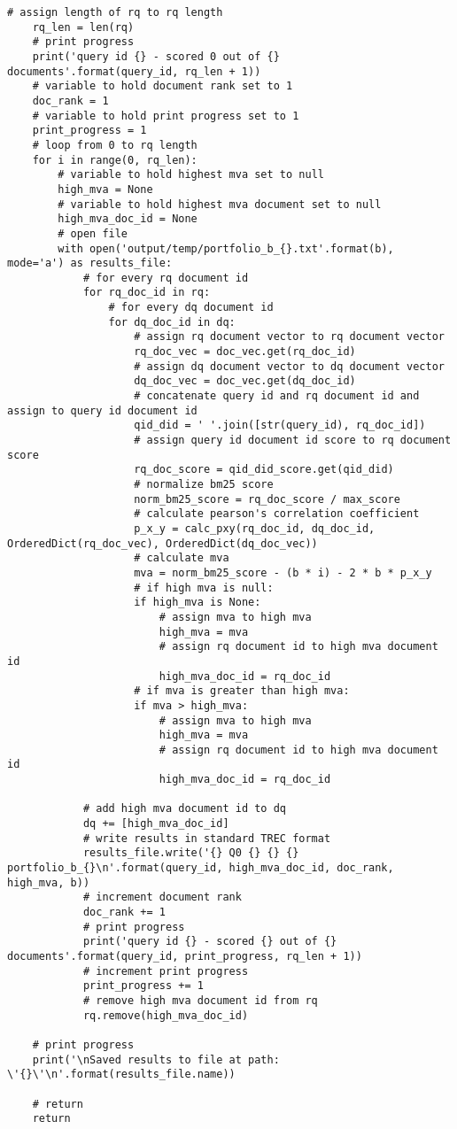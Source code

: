 \documentclass{article} %
\begin{document}
\begin{lstlisting}[style=Python]
    # assign length of rq to rq length
    rq_len = len(rq)
    # print progress
    print('query id {} - scored 0 out of {} documents'.format(query_id, rq_len + 1))
    # variable to hold document rank set to 1
    doc_rank = 1
    # variable to hold print progress set to 1
    print_progress = 1
    # loop from 0 to rq length
    for i in range(0, rq_len):
        # variable to hold highest mva set to null
        high_mva = None
        # variable to hold highest mva document set to null
        high_mva_doc_id = None
        # open file
        with open('output/temp/portfolio_b_{}.txt'.format(b), mode='a') as results_file:
            # for every rq document id
            for rq_doc_id in rq:
                # for every dq document id
                for dq_doc_id in dq:
                    # assign rq document vector to rq document vector
                    rq_doc_vec = doc_vec.get(rq_doc_id)
                    # assign dq document vector to dq document vector
                    dq_doc_vec = doc_vec.get(dq_doc_id)
                    # concatenate query id and rq document id and assign to query id document id
                    qid_did = ' '.join([str(query_id), rq_doc_id])
                    # assign query id document id score to rq document score
                    rq_doc_score = qid_did_score.get(qid_did)
                    # normalize bm25 score
                    norm_bm25_score = rq_doc_score / max_score
                    # calculate pearson's correlation coefficient
                    p_x_y = calc_pxy(rq_doc_id, dq_doc_id, OrderedDict(rq_doc_vec), OrderedDict(dq_doc_vec))
                    # calculate mva
                    mva = norm_bm25_score - (b * i) - 2 * b * p_x_y
                    # if high mva is null:
                    if high_mva is None:
                        # assign mva to high mva
                        high_mva = mva
                        # assign rq document id to high mva document id
                        high_mva_doc_id = rq_doc_id
                    # if mva is greater than high mva:
                    if mva > high_mva:
                        # assign mva to high mva
                        high_mva = mva
                        # assign rq document id to high mva document id
                        high_mva_doc_id = rq_doc_id

            # add high mva document id to dq
            dq += [high_mva_doc_id]
            # write results in standard TREC format
            results_file.write('{} Q0 {} {} {} portfolio_b_{}\n'.format(query_id, high_mva_doc_id, doc_rank, high_mva, b))
            # increment document rank
            doc_rank += 1
            # print progress
            print('query id {} - scored {} out of {} documents'.format(query_id, print_progress, rq_len + 1))
            # increment print progress
            print_progress += 1
            # remove high mva document id from rq
            rq.remove(high_mva_doc_id)

    # print progress
    print('\nSaved results to file at path: \'{}\'\n'.format(results_file.name))

    # return
    return
\end{lstlisting}
\end{document}
